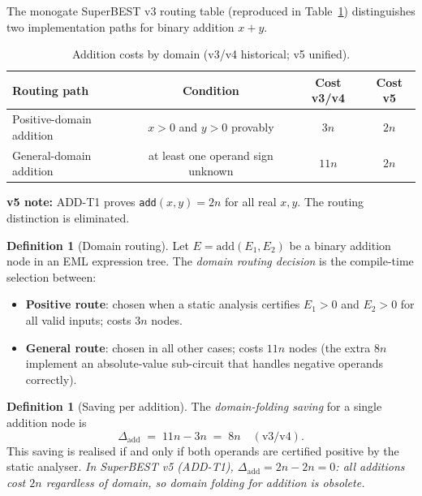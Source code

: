 \documentclass[12pt,a4paper]{article}
\theoremstyle{definition}
\newtheorem{definition}[theorem]{Definition}
\begin{document}
The monogate SuperBEST v3 routing table (reproduced in
Table~\ref{tab:add-costs}) distinguishes two implementation paths for binary
addition $x + y$.

\begin{table}[h]
\centering
\caption{Addition costs by domain (v3/v4 historical; v5 unified).}
\label{tab:add-costs}
\smallskip
\begin{tabular}{@{}lccc@{}}
\toprule
\textbf{Routing path} & \textbf{Condition} & \textbf{Cost v3/v4} & \textbf{Cost v5} \\
\midrule
Positive-domain addition & $x > 0$ and $y > 0$ provably & $3n$ & $2n$ \\
General-domain addition  & at least one operand sign unknown & $11n$ & $2n$ \\
\bottomrule
\end{tabular}
\smallskip

\noindent\textbf{v5 note:} ADD-T1 proves \texttt{add}$(x,y) = 2n$ for all real $x,y$.
The routing distinction is eliminated.
\end{table}

\begin{definition}[Domain routing]
\label{def:domain-routing}
Let $E = \mathrm{add}(E_1, E_2)$ be a binary addition node in an EML expression
tree.  The \emph{domain routing decision} is the compile-time selection between:
\begin{itemize}
  \item \textbf{Positive route}: chosen when a static analysis certifies
        $E_1 > 0$ and $E_2 > 0$ for all valid inputs; costs $3n$ nodes.
  \item \textbf{General route}: chosen in all other cases; costs $11n$ nodes
        (the extra $8n$ implement an absolute-value sub-circuit that handles
        negative operands correctly).
\end{itemize}
\end{definition}

\begin{definition}[Saving per addition]
\label{def:saving}
The \emph{domain-folding saving} for a single addition node is
\[
  \Delta_{\mathrm{add}} \;=\; 11n - 3n \;=\; 8n \quad(\text{v3/v4}).
\]
This saving is realised if and only if both operands are certified positive by
the static analyser.  \emph{In SuperBEST v5 (ADD-T1), $\Delta_{\mathrm{add}} = 2n - 2n = 0$:
all additions cost $2n$ regardless of domain, so domain folding for addition
is obsolete.}
\end{definition}
\end{document}

